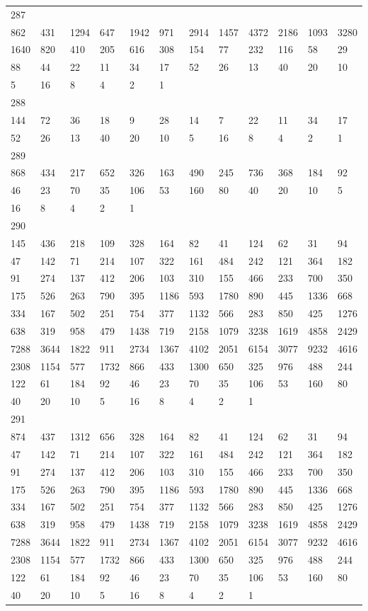 \begin{longtable}{llllllllllll}
287&&&&&&&&&&&\\
862& 431& 1294& 647& 1942& 971& 2914& 1457& 4372& 2186& 1093& 3280\\
1640& 820& 410& 205& 616& 308& 154& 77& 232& 116& 58& 29\\
88& 44& 22& 11& 34& 17& 52& 26& 13& 40& 20& 10\\
5& 16& 8& 4& 2& 1& \\

288&&&&&&&&&&&\\
144& 72& 36& 18& 9& 28& 14& 7& 22& 11& 34& 17\\
52& 26& 13& 40& 20& 10& 5& 16& 8& 4& 2& 1\\

289&&&&&&&&&&&\\
868& 434& 217& 652& 326& 163& 490& 245& 736& 368& 184& 92\\
46& 23& 70& 35& 106& 53& 160& 80& 40& 20& 10& 5\\
16& 8& 4& 2& 1& \\

290&&&&&&&&&&&\\
145& 436& 218& 109& 328& 164& 82& 41& 124& 62& 31& 94\\
47& 142& 71& 214& 107& 322& 161& 484& 242& 121& 364& 182\\
91& 274& 137& 412& 206& 103& 310& 155& 466& 233& 700& 350\\
175& 526& 263& 790& 395& 1186& 593& 1780& 890& 445& 1336& 668\\
334& 167& 502& 251& 754& 377& 1132& 566& 283& 850& 425& 1276\\
638& 319& 958& 479& 1438& 719& 2158& 1079& 3238& 1619& 4858& 2429\\
7288& 3644& 1822& 911& 2734& 1367& 4102& 2051& 6154& 3077& 9232& 4616\\
2308& 1154& 577& 1732& 866& 433& 1300& 650& 325& 976& 488& 244\\
122& 61& 184& 92& 46& 23& 70& 35& 106& 53& 160& 80\\
40& 20& 10& 5& 16& 8& 4& 2& 1& \\

291&&&&&&&&&&&\\
874& 437& 1312& 656& 328& 164& 82& 41& 124& 62& 31& 94\\
47& 142& 71& 214& 107& 322& 161& 484& 242& 121& 364& 182\\
91& 274& 137& 412& 206& 103& 310& 155& 466& 233& 700& 350\\
175& 526& 263& 790& 395& 1186& 593& 1780& 890& 445& 1336& 668\\
334& 167& 502& 251& 754& 377& 1132& 566& 283& 850& 425& 1276\\
638& 319& 958& 479& 1438& 719& 2158& 1079& 3238& 1619& 4858& 2429\\
7288& 3644& 1822& 911& 2734& 1367& 4102& 2051& 6154& 3077& 9232& 4616\\
2308& 1154& 577& 1732& 866& 433& 1300& 650& 325& 976& 488& 244\\
122& 61& 184& 92& 46& 23& 70& 35& 106& 53& 160& 80\\
40& 20& 10& 5& 16& 8& 4& 2& 1& \\


\end{longtable}
